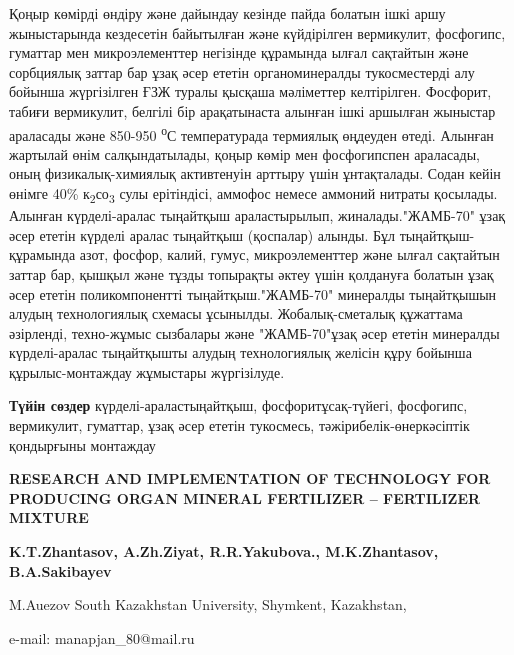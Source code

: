 Қоңыр көмірді өндіру және дайындау кезінде пайда болатын ішкі аршу
жыныстарында кездесетін байытылған және күйдірілген вермикулит,
фосфогипс, гуматтар мен микроэлементтер негізінде құрамында ылғал
сақтайтын және сорбциялық заттар бар ұзақ әсер ететін органоминералды
тукосместерді алу бойынша жүргізілген ҒЗЖ туралы қысқаша мәліметтер
келтірілген. Фосфорит, табиғи вермикулит, белгілі бір арақатынаста
алынған ішкі аршылған жыныстар араласады және 850-950
\textsuperscript{о}С температурада термиялық өңдеуден өтеді. Алынған
жартылай өнім салқындатылады, қоңыр көмір мен фосфогипспен араласады,
оның физикалық-химиялық активтенуін арттыру үшін ұнтақталады. Содан
кейін өнімге 40\% к\textsubscript{2}со\textsubscript{3} сулы ерітіндісі,
аммофос немесе аммоний нитраты қосылады. Алынған күрделі-аралас
тыңайтқыш араластырылып, жиналады."ЖАМБ-70" ұзақ әсер ететін күрделі
аралас тыңайтқыш (қоспалар) алынды. Бұл тыңайтқыш-құрамында азот,
фосфор, калий, гумус, микроэлементтер және ылғал сақтайтын заттар бар,
қышқыл және тұзды топырақты әктеу үшін қолдануға болатын ұзақ әсер
ететін поликомпонентті тыңайтқыш."ЖАМБ-70" минералды тыңайтқышын алудың
технологиялық схемасы ұсынылды. Жобалық-сметалық құжаттама әзірленді,
техно-жұмыс сызбалары және "ЖАМБ-70"ұзақ әсер ететін минералды
күрделі-аралас тыңайтқышты алудың технологиялық желісін құру бойынша
құрылыс-монтаждау жұмыстары жүргізілуде.

{\bfseries Түйін сөздер} күрделі-араластыңайтқыш, фосфоритұсақ-түйегі,
фосфогипс, вермикулит, гуматтар, ұзақ әсер ететін тукосмесь,
тәжірибелік-өнеркәсіптік қондырғыны монтаждау

\begin{center}
{\large\bfseries RESEARCH AND IMPLEMENTATION OF TECHNOLOGY FOR PRODUCING ORGAN MINERAL FERTILIZER -- FERTILIZER MIXTURE}

{\bfseries K.T.Zhantasov, A.Zh.Ziyat, R.R.Yakubova., M.K.Zhantasov,
B.A.Sakibayev}

M.Auezov South Kazakhstan University, Shymkent, Kazakhstan,

e-mail: manapjan\_80@mail.ru
\end{center}

